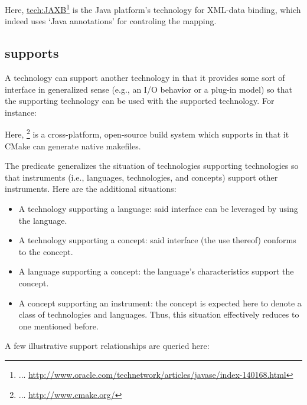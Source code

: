 
\noindent
Here, \url{tech:JAXB}\footnote{... 
  \url{http://www.oracle.com/technetwork/articles/javase/index-140168.html}}
is the Java platform's technology for XML-data binding, which indeed
uses `Java annotations' for controling the mapping.


\subsection{supports}
\label{S:supports}

A technology can support another technology in that it provides some
sort of interface in generalized sense (e.g., an I/O behavior or a
plug-in model) so that the supporting technology can be used with the
supported technology. For instance:


\noindent
Here, \footnote{... 
  \url{http://www.cmake.org/}} is a cross-platform, open-source build
system which supports  in that it CMake can generate
native makefiles.

The predicate  generalizes the situation of
technologies supporting technologies so that instruments (i.e.,
languages, technologies, and concepts) support other instruments. Here
are the additional situations:
%
\begin{itemize}
\item A technology supporting a language: said interface can be
  leveraged by using the language.
\item A technology supporting a concept: said interface (the use
  thereof) conforms to the concept.
\item A language supporting a concept: the language's characteristics
  support the concept.
\item A concept supporting an instrument: the concept is expected here
  to denote a class of technologies and languages. Thus, this
  situation effectively reduces to one mentioned before.
\end{itemize}

\noindent
A few illustrative support relationships are queried here:



